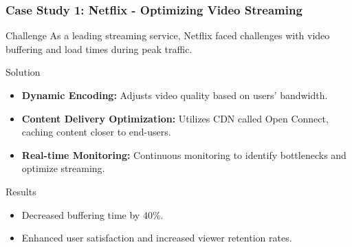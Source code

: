 \documentclass{beamer}
\begin{document}
\begin{frame}[fragile]
    \frametitle{Case Study 1: Netflix - Optimizing Video Streaming}
    \begin{block}{Challenge}
        As a leading streaming service, Netflix faced challenges with video buffering and load times during peak traffic.
    \end{block}

    \begin{block}{Solution}
        \begin{itemize}
            \item \textbf{Dynamic Encoding:} Adjusts video quality based on users' bandwidth.
            \item \textbf{Content Delivery Optimization:} Utilizes CDN called Open Connect, caching content closer to end-users.
            \item \textbf{Real-time Monitoring:} Continuous monitoring to identify bottlenecks and optimize streaming.
        \end{itemize}
    \end{block}

    \begin{block}{Results}
        \begin{itemize}
            \item Decreased buffering time by 40\%.
            \item Enhanced user satisfaction and increased viewer retention rates.
        \end{itemize}
    \end{block}
\end{frame}
\end{document}
